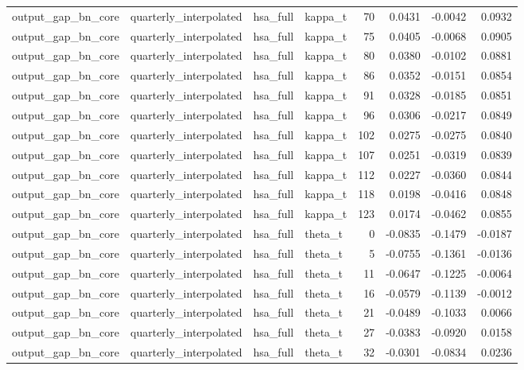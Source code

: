 \begin{tabular}{llllrrrr}
output\_gap\_bn\_core & quarterly\_interpolated & hsa\_full & kappa\_t & 70 & 0.0431 & -0.0042 & 0.0932 \\
output\_gap\_bn\_core & quarterly\_interpolated & hsa\_full & kappa\_t & 75 & 0.0405 & -0.0068 & 0.0905 \\
output\_gap\_bn\_core & quarterly\_interpolated & hsa\_full & kappa\_t & 80 & 0.0380 & -0.0102 & 0.0881 \\
output\_gap\_bn\_core & quarterly\_interpolated & hsa\_full & kappa\_t & 86 & 0.0352 & -0.0151 & 0.0854 \\
output\_gap\_bn\_core & quarterly\_interpolated & hsa\_full & kappa\_t & 91 & 0.0328 & -0.0185 & 0.0851 \\
output\_gap\_bn\_core & quarterly\_interpolated & hsa\_full & kappa\_t & 96 & 0.0306 & -0.0217 & 0.0849 \\
output\_gap\_bn\_core & quarterly\_interpolated & hsa\_full & kappa\_t & 102 & 0.0275 & -0.0275 & 0.0840 \\
output\_gap\_bn\_core & quarterly\_interpolated & hsa\_full & kappa\_t & 107 & 0.0251 & -0.0319 & 0.0839 \\
output\_gap\_bn\_core & quarterly\_interpolated & hsa\_full & kappa\_t & 112 & 0.0227 & -0.0360 & 0.0844 \\
output\_gap\_bn\_core & quarterly\_interpolated & hsa\_full & kappa\_t & 118 & 0.0198 & -0.0416 & 0.0848 \\
output\_gap\_bn\_core & quarterly\_interpolated & hsa\_full & kappa\_t & 123 & 0.0174 & -0.0462 & 0.0855 \\
output\_gap\_bn\_core & quarterly\_interpolated & hsa\_full & theta\_t & 0 & -0.0835 & -0.1479 & -0.0187 \\
output\_gap\_bn\_core & quarterly\_interpolated & hsa\_full & theta\_t & 5 & -0.0755 & -0.1361 & -0.0136 \\
output\_gap\_bn\_core & quarterly\_interpolated & hsa\_full & theta\_t & 11 & -0.0647 & -0.1225 & -0.0064 \\
output\_gap\_bn\_core & quarterly\_interpolated & hsa\_full & theta\_t & 16 & -0.0579 & -0.1139 & -0.0012 \\
output\_gap\_bn\_core & quarterly\_interpolated & hsa\_full & theta\_t & 21 & -0.0489 & -0.1033 & 0.0066 \\
output\_gap\_bn\_core & quarterly\_interpolated & hsa\_full & theta\_t & 27 & -0.0383 & -0.0920 & 0.0158 \\
output\_gap\_bn\_core & quarterly\_interpolated & hsa\_full & theta\_t & 32 & -0.0301 & -0.0834 & 0.0236 \\

\end{tabular}
